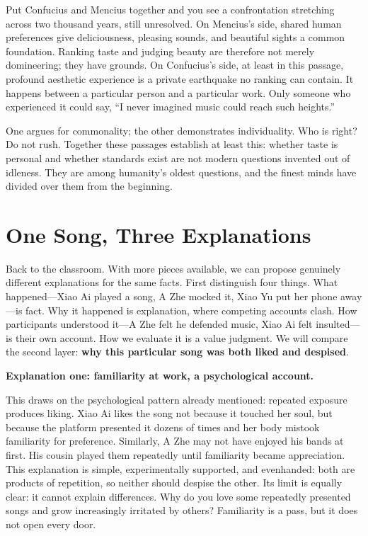 Put Confucius and Mencius together and you see a confrontation stretching across two thousand years, still unresolved. On Mencius's side, shared human preferences give deliciousness, pleasing sounds, and beautiful sights a common foundation. Ranking taste and judging beauty are therefore not merely domineering; they have grounds. On Confucius's side, at least in this passage, profound aesthetic experience is a private earthquake no ranking can contain. It happens between a particular person and a particular work. Only someone who experienced it could say, ``I never imagined music could reach such heights.''

One argues for commonality; the other demonstrates individuality. Who is right? Do not rush. Together these passages establish at least this: whether taste is personal and whether standards exist are not modern questions invented out of idleness. They are among humanity's oldest questions, and the finest minds have divided over them from the beginning.

\section{One Song, Three Explanations}
Back to the classroom. With more pieces available, we can propose genuinely different explanations for the same facts. First distinguish four things. What happened---Xiao Ai played a song, A Zhe mocked it, Xiao Yu put her phone away---is fact. Why it happened is explanation, where competing accounts clash. How participants understood it---A Zhe felt he defended music, Xiao Ai felt insulted---is their own account. How we evaluate it is a value judgment. We will compare the second layer: \textbf{why this particular song was both liked and despised}.

\textbf{Explanation one: familiarity at work, a psychological account.}

This draws on the psychological pattern already mentioned: repeated exposure produces liking. Xiao Ai likes the song not because it touched her soul, but because the platform presented it dozens of times and her body mistook familiarity for preference. Similarly, A Zhe may not have enjoyed his bands at first. His cousin played them repeatedly until familiarity became appreciation. This explanation is simple, experimentally supported, and evenhanded: both are products of repetition, so neither should despise the other. Its limit is equally clear: it cannot explain differences. Why do you love some repeatedly presented songs and grow increasingly irritated by others? Familiarity is a pass, but it does not open every door.

